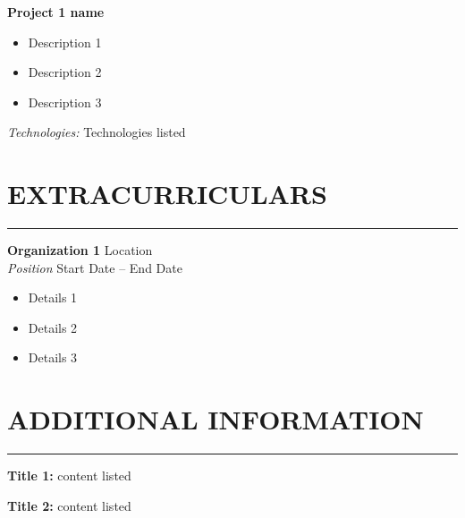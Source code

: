 \documentclass[10.5pt]{article}
\begin{document}
\noindent
\textbf{Project 1 name}
\begin{itemize}
    \item Description 1
    \item Description 2
    \item Description 3
\end{itemize}
\emph{Technologies:} Technologies listed

\section*{\large\textbf{EXTRACURRICULARS}}
\vspace{-\baselineskip}
\noindent\rule{\textwidth}{0.4pt}

\noindent
\textbf{Organization 1} \hfill Location \\
\emph{Position} \hfill Start Date -- End Date
\begin{itemize}
    \item Details 1
    \item Details 2
    \item Details 3
\end{itemize}

\section*{\large\textbf{ADDITIONAL INFORMATION}}
\vspace{-\baselineskip}
\noindent\rule{\textwidth}{0.4pt}

\noindent
\textbf{Title 1:} content listed

\noindent
\textbf{Title 2:} content listed
\end{document}
